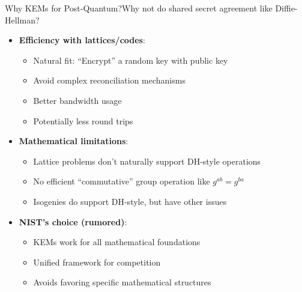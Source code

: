 \documentclass[aspectratio=169, lualatex, handout]{beamer}
\begin{document}
\begin{frame}{Why KEMs for Post-Quantum?}{Why not do shared secret agreement like Diffie-Hellman?}
	\begin{itemize}
		\item \textbf{Efficiency with lattices/codes}:
		      \begin{itemize}
			      \item Natural fit: ``Encrypt'' a random key with public key
			      \item Avoid complex reconciliation mechanisms
			      \item Better bandwidth usage
			      \item Potentially less round trips
		      \end{itemize}
		\item \textbf{Mathematical limitations}:
		      \begin{itemize}
			      \item Lattice problems don't naturally support DH-style operations
			      \item No efficient ``commutative'' group operation like $g^{ab} = g^{ba}$
			      \item Isogenies do support DH-style, but have other issues
		      \end{itemize}
		\item \textbf{NIST's choice (rumored)}:
		      \begin{itemize}
			      \item KEMs work for all mathematical foundations
			      \item Unified framework for competition
			      \item Avoids favoring specific mathematical structures
		      \end{itemize}
	\end{itemize}
\end{frame}
\end{document}
